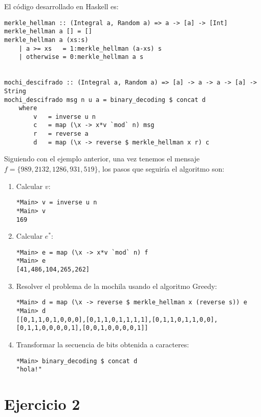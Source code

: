 \documentclass[10pt,spanish]{article}
\begin{document}
El código desarrollado en Haskell es:

\begin{verbatim}
merkle_hellman :: (Integral a, Random a) => a -> [a] -> [Int]
merkle_hellman a [] = []
merkle_hellman a (xs:s)
    | a >= xs   = 1:merkle_hellman (a-xs) s
    | otherwise = 0:merkle_hellman a s 


mochi_descifrado :: (Integral a, Random a) => [a] -> a -> a -> [a] -> String
mochi_descifrado msg n u a = binary_decoding $ concat d
    where
        v   = inverse u n
        c   = map (\x -> x*v `mod` n) msg
        r   = reverse a
        d   = map (\x -> reverse $ merkle_hellman x r) c
\end{verbatim}

Siguiendo con el ejemplo anterior, una vez tenemos el mensaje $f = \{989,2132,1286,931,519\}$, los pasos que seguiría el algoritmo son:

\begin{enumerate}[1.]
    \item Calcular $v$:

\begin{verbatim}
*Main> v = inverse u n
*Main> v
169
\end{verbatim}

    \item Calcular $e^*$:

\begin{verbatim}
*Main> e = map (\x -> x*v `mod` n) f
*Main> e
[41,486,104,265,262]
\end{verbatim}

    \item Resolver el problema de la mochila usando el algoritmo Greedy:

\begin{verbatim}
*Main> d = map (\x -> reverse $ merkle_hellman x (reverse s)) e
*Main> d
[[0,1,1,0,1,0,0,0],[0,1,1,0,1,1,1,1],[0,1,1,0,1,1,0,0],[0,1,1,0,0,0,0,1],[0,0,1,0,0,0,0,1]]
\end{verbatim}

    \item Transformar la secuencia de bits obtenida a caracteres:

\begin{verbatim}
*Main> binary_decoding $ concat d
"hola!"
\end{verbatim}
\end{enumerate}

\section{\textcolor{azul}Ejercicio 2}
\end{document}
